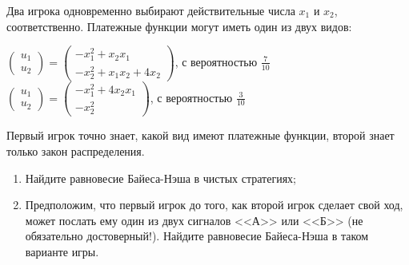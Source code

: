 \begin{problem}

Два игрока одновременно выбирают действительные числа  $x_{1} $  и  $x_{2} $, соответственно.
Платежные функции могут иметь один из двух видов:

 $\left(\begin{array}{l} {u_{1} } \\ {u_{2} } \end{array}\right)=\left(\begin{array}{l} {-x_{1}^{2} +x_{2} x_{1} } \\ {-x_{2}^{2} +x_{1} x_{2} +4x_{2} } \end{array}\right)$, с вероятностью  $\frac{7}{10} $ \\
 $\left(\begin{array}{l} {u_{1} } \\ {u_{2} } \end{array}\right)=\left(\begin{array}{l} {-x_{1}^{2} +4x_{2} x_{1} } \\ {-x_{2}^{2} } \end{array}\right)$, с вероятностью  $\frac{3}{10} $ \par
Первый игрок точно знает, какой вид имеют платежные функции, второй знает только закон распределения.\par
\begin{enumerate}
\item	Найдите равновесие Байеса-Нэша в чистых стратегиях;\par
\item Предположим, что первый игрок до того, как второй игрок сделает свой ход, может послать ему один из двух сигналов <<А>> или <<Б>> (не обязательно достоверный!). Найдите равновесие Байеса-Нэша в таком варианте игры.\par
\end{enumerate}


\begin{sol}

\end{sol}
\end{problem}





